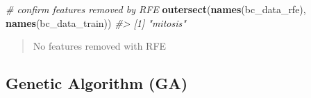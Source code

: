 \documentclass[]{book}
\newenvironment{Shaded}{\begin{snugshade}}{\end{snugshade}}
\newcommand{\CommentTok}[1]{\textcolor[rgb]{0.56,0.35,0.01}{\textit{#1}}}
\newcommand{\KeywordTok}[1]{\textcolor[rgb]{0.13,0.29,0.53}{\textbf{#1}}}
\newcommand{\NormalTok}[1]{#1}
\begin{document}
\begin{Shaded}
\begin{Highlighting}[]
\CommentTok{# confirm features removed by RFE}
\KeywordTok{outersect}\NormalTok{(}\KeywordTok{names}\NormalTok{(bc_data_rfe), }\KeywordTok{names}\NormalTok{(bc_data_train))}
\CommentTok{#> [1] "mitosis"}
\end{Highlighting}
\end{Shaded}

\begin{quote}
No features removed with RFE
\end{quote}

\hypertarget{genetic-algorithm-ga}{%
\subsection{Genetic Algorithm (GA)}\label{genetic-algorithm-ga}}
\end{document}
